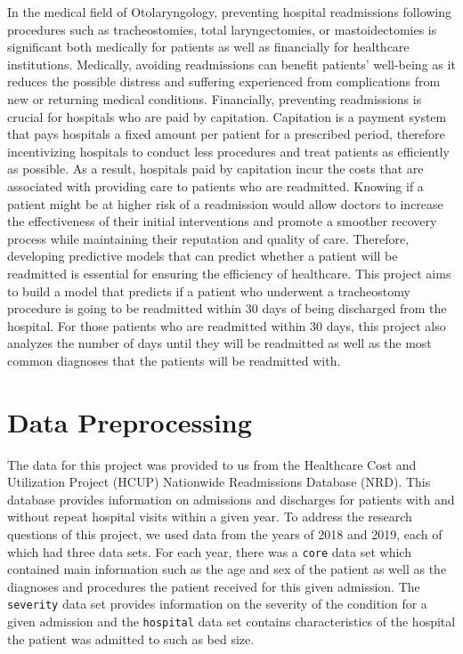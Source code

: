 \documentclass[sn-basic,pdflatex]{sn-jnl}
\theoremstyle{remark}
\theoremstyle{definition}
\begin{document}
In the medical field of Otolaryngology, preventing hospital readmissions
following procedures such as tracheostomies, total laryngectomies, or
mastoidectomies is significant both medically for patients as well as
financially for healthcare institutions. Medically, avoiding
readmissions can benefit patients' well-being as it reduces the possible
distress and suffering experienced from complications from new or
returning medical conditions. Financially, preventing readmissions is
crucial for hospitals who are paid by capitation. Capitation is a
payment system that pays hospitals a fixed amount per patient for a
prescribed period, therefore incentivizing hospitals to conduct less
procedures and treat patients as efficiently as possible. As a result,
hospitals paid by capitation incur the costs that are associated with
providing care to patients who are readmitted. Knowing if a patient
might be at higher risk of a readmission would allow doctors to increase
the effectiveness of their initial interventions and promote a smoother
recovery process while maintaining their reputation and quality of care.
Therefore, developing predictive models that can predict whether a
patient will be readmitted is essential for ensuring the efficiency of
healthcare. \newline \newline This project aims to build a model that
predicts if a patient who underwent a tracheostomy procedure is going to
be readmitted within 30 days of being discharged from the hospital. For
those patients who are readmitted within 30 days, this project also
analyzes the number of days until they will be readmitted as well as the
most common diagnoses that the patients will be readmitted with.

\hypertarget{sec2}{%
\section{Data Preprocessing}\label{sec2}}

The data for this project was provided to us from the Healthcare Cost
and Utilization Project (HCUP) Nationwide Readmissions Database (NRD).
This database provides information on admissions and discharges for
patients with and without repeat hospital visits within a given year. To
address the research questions of this project, we used data from the
years of 2018 and 2019, each of which had three data sets. For each
year, there was a \texttt{core} data set which contained main
information such as the age and sex of the patient as well as the
diagnoses and procedures the patient received for this given admission.
The \texttt{severity} data set provides information on the severity of
the condition for a given admission and the \texttt{hospital} data set
contains characteristics of the hospital the patient was admitted to
such as bed size.
\end{document}

